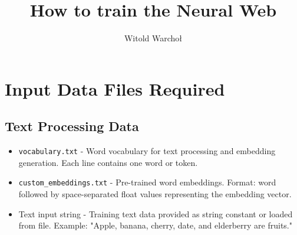 \documentclass[11pt,a4paper]{article}
\title{\textbf{How to train the Neural Web}}
\author{Witold Warchoł}
\date{}
\begin{document}
\maketitle

\section{Input Data Files Required}

\subsection{Text Processing Data}
\begin{itemize}[leftmargin=0.5in]
    \item \texttt{vocabulary.txt} - Word vocabulary for text processing and 
    embedding generation. Each line contains one word or token.
    
    \item \texttt{custom\_embeddings.txt} - Pre-trained word embeddings. 
    Format: word followed by space-separated float values representing the 
    embedding vector.
    
    \item Text input string - Training text data provided as string constant 
    or loaded from file. Example: "Apple, banana, cherry, date, and 
    elderberry are fruits."
\end{itemize}
\end{document}
